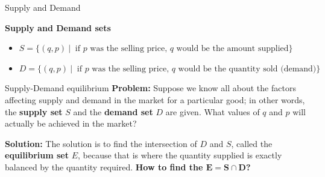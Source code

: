 \documentclass[9pt]{beamer}
\begin{document}
\begin{frame}{Supply and Demand}

    \textbf{Supply and Demand sets}
    \begin{itemize}[leftmargin = 0.5cm, label = $\bullet$, rightmargin = 0.2cm]
        \item $S = \{(q, p)\ |\ \text{ if $p$ was the selling price, $q$ would be the amount supplied}\}$
        \item $D = \{(q, p)\ |\ \text{ if $p$ was the selling price, $q$ would be the quantity sold (demand)}\}$
    \end{itemize}

    \begin{block}{Supply-Demand equilibrium}
        \textbf{Problem:} Suppose we know all about the factors affecting supply and demand in the market for a particular good; in other words, the \textbf{supply set} $S$ and the \textbf{demand set} $D$ are given. What values of $q$ and $p$ will actually be achieved in the market?

        \textbf{Solution:} The solution is to find the intersection of $D$ and $S$, called the \textbf{equilibrium set} $E$, because that is where the quantity supplied is exactly balanced by the quantity required.
        \textbf{How to find the $\pmb{E = S\cap D}$?}
    \end{block}
    
\end{frame}
\end{document}
